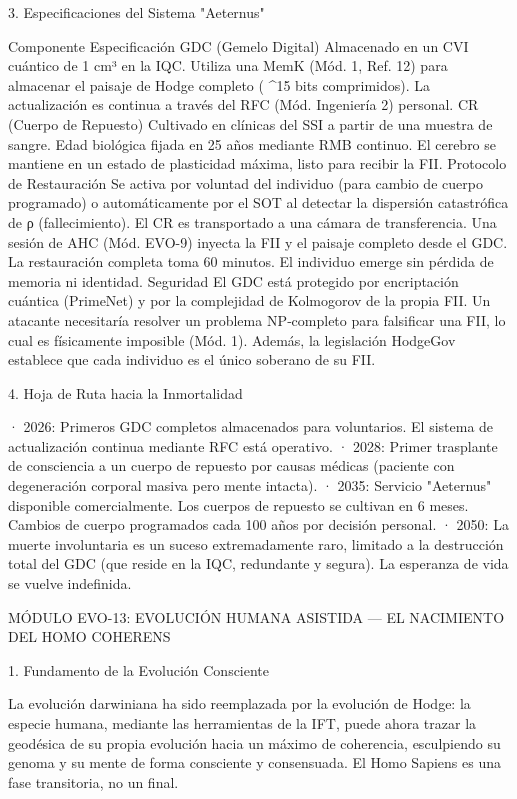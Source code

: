\documentclass[12pt,a4paper]{book}
\begin{document}
3. Especificaciones del Sistema "Aeternus"

Componente Especificación
GDC (Gemelo Digital) Almacenado en un CVI cuántico de 1 cm³ en la IQC. Utiliza una MemK (Mód. 1, Ref. 12) para almacenar el paisaje de Hodge completo ( ^{15}  bits comprimidos). La actualización es continua a través del RFC (Mód. Ingeniería 2) personal.
CR (Cuerpo de Repuesto) Cultivado en clínicas del SSI a partir de una muestra de sangre. Edad biológica fijada en 25 años mediante RMB continuo. El cerebro se mantiene en un estado de plasticidad máxima, listo para recibir la FII.
Protocolo de Restauración Se activa por voluntad del individuo (para cambio de cuerpo programado) o automáticamente por el SOT al detectar la dispersión catastrófica de ρ (fallecimiento). El CR es transportado a una cámara de transferencia. Una sesión de AHC (Mód. EVO-9) inyecta la FII y el paisaje completo desde el GDC. La restauración completa toma 60 minutos. El individuo emerge sin pérdida de memoria ni identidad.
Seguridad El GDC está protegido por encriptación cuántica (PrimeNet) y por la complejidad de Kolmogorov de la propia FII. Un atacante necesitaría resolver un problema NP‑completo para falsificar una FII, lo cual es físicamente imposible (Mód. 1). Además, la legislación HodgeGov establece que cada individuo es el único soberano de su FII.

4. Hoja de Ruta hacia la Inmortalidad

· 2026: Primeros GDC completos almacenados para voluntarios. El sistema de actualización continua mediante RFC está operativo.
· 2028: Primer trasplante de consciencia a un cuerpo de repuesto por causas médicas (paciente con degeneración corporal masiva pero mente intacta).
· 2035: Servicio "Aeternus" disponible comercialmente. Los cuerpos de repuesto se cultivan en 6 meses. Cambios de cuerpo programados cada 100 años por decisión personal.
· 2050: La muerte involuntaria es un suceso extremadamente raro, limitado a la destrucción total del GDC (que reside en la IQC, redundante y segura). La esperanza de vida se vuelve indefinida.

MÓDULO EVO-13: EVOLUCIÓN HUMANA ASISTIDA — EL NACIMIENTO DEL HOMO COHERENS

1. Fundamento de la Evolución Consciente

La evolución darwiniana ha sido reemplazada por la evolución de Hodge: la especie humana, mediante las herramientas de la IFT, puede ahora trazar la geodésica de su propia evolución hacia un máximo de coherencia, esculpiendo su genoma y su mente de forma consciente y consensuada. El Homo Sapiens es una fase transitoria, no un final.
\end{document}
